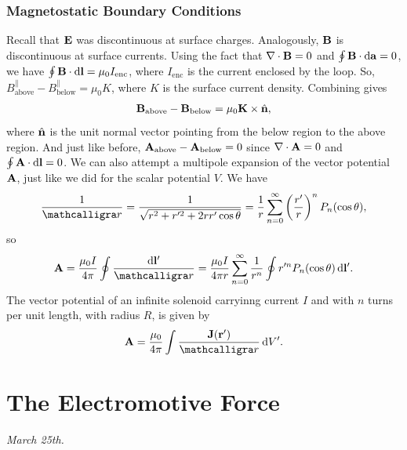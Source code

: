 \subsubsection{Magnetostatic Boundary Conditions}

Recall that $\mathbf{E}$ was discontinuous at surface charges. Analogously, $\mathbf{B}$ is discontinuous at surface currents. Using the fact that $\nabla \cdot \mathbf{B} = 0$ and $\oint \mathbf{B} \cdot \mathrm{d}\mathbf{a} = 0$, we have $\oint \mathbf{B} \cdot \mathrm{d}\mathbf{l} = \mu_{0} I_{\text{enc}}$, where $I_{\text{enc}}$ is the current enclosed by the loop. So, $B^{\parallel}_{\text{above}} - B^{\parallel}_{\text{below}} = \mu_{0} K$, where $K$ is the surface current density. Combining gives
\begin{align}
    \mathbf{B}_{\text{above}} - \mathbf{B}_{\text{below}} = \mu_{0} \mathbf{K} \times \hat{\mathbf{n}},
\end{align}
where $\hat{\mathbf{n}}$ is the unit normal vector pointing from the below region to the above region. And just like before, $\mathbf{A}_{\text{above}} - \mathbf{A}_{\text{below}} = 0$ since $\nabla \cdot \mathbf{A} = 0$ and $\oint \mathbf{A} \cdot \mathrm{d}\mathbf{l} = 0$. We can also attempt a multipole expansion of the vector potential $\mathbf{A}$, just like we did for the scalar potential $V$. We have
\begin{align}
    \frac{1}{\curs{r}} = \frac{1}{\sqrt{r^{2}+r'^{2}+2rr'\cos \theta}} = \frac{1}{r} \sum_{n = 0}^{\infty} \left( \frac{r'}{r} \right)^{n} P_{n}(\cos \theta),
\end{align}
so
\begin{align}
    \bv{A} = \frac{\mu_{0} I}{4 \pi} \oint \frac{\di{\bv{l}'}}{\curs{r}} = \frac{\mu_{0} I}{4 \pi r} \sum_{n = 0}^{\infty} \frac{1}{r^{n}} \oint r'^{n} P_{n}(\cos \theta) \, \di{\bv{l}'}.
\end{align}
The vector potential of an infinite solenoid carryinng current $I$ and with $n$ turns per unit length, with radius $R$, is given by
\begin{align}
    \bv{A} = \frac{\mu_{0}}{4 \pi} \int \frac{\bv{J}(\bv{r}')}{\curs{r}} \, \di{V}'.
\end{align}

\section{The Electromotive Force}
\textit{March 25th.}

